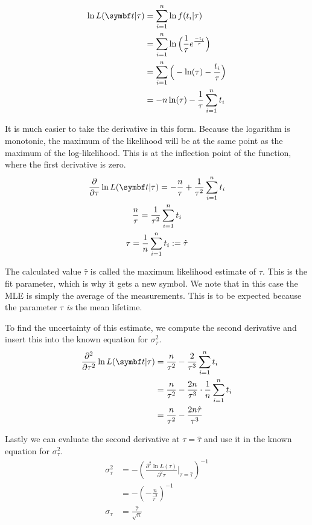 \begin{align}
    \ln L(\vec{t} \given \tau) &= \sum \limits_{i = 1}^{n} \ln f(t_i \given \tau) \\
    &= \sum \limits_{i = 1}^{n} \ln \Big( \frac{1}{\tau} e^{\frac{-t_i}{\tau}} \Big) \\
    &= \sum \limits_{i = 1}^{n} \Big( - \ln (\tau) - \frac{t_i}{\tau} \Big) \\
    &= - n \ln (\tau) - \frac{1}{\tau} \sum \limits_{i = 1}^{n} t_i
\end{align}

It is much easier to take the derivative in this form. Because the logarithm is monotonic, the maximum of the likelihood will be at the same point as the maximum of the log-likelihood. This is at the inflection point of the function, where the first derivative is zero.
\begin{gather}
    \frac{\partial}{\partial \tau} \ln L(\vec{t} \given \tau) = -\frac{n}{\tau} + \frac{1}{\tau^2} \sum \limits_{i = 1}^{n} t_i \\
    \frac{n}{\tau} = \frac{1}{\tau^2} \sum \limits_{i = 1}^{n} t_i \\
    \tau = \frac{1}{n} \sum \limits_{i = 1}^{n} t_i := \hat{\tau}
    \label{eq:mle:tau_hat_mle}
\end{gather}

The calculated value \( \hat{\tau} \) is called the maximum likelihood estimate of \( \tau \). This is the fit parameter, which is why it gets a new symbol. We note that in this case the MLE is simply the average of the measurements. This is to be expected because the parameter \( \tau \) \emph{is} the mean lifetime.

To find the uncertainty of this estimate, we compute the second derivative and insert this into the known equation for $\sigma_\tau^2$.
\begin{align}
    \frac{\partial^2}{\partial \tau^2} \ln L(\vec{t} \given \tau) &= \frac{n}{\tau^2} - \frac{2}{\tau^3} \sum \limits_{i = 1}^{n} t_i \\
    &= \frac{n}{\tau^2} - \frac{2 n}{\tau^3} \cdot \frac{1}{n} \sum \limits_{i = 1}^{n} t_i \\
    &= \frac{n}{\tau^2} - \frac{2 n \hat{\tau}}{\tau^3}
\end{align}

Lastly we can evaluate the second derivative at $\tau = \hat{\tau}$ and use it in the known equation for $\sigma_\tau^2$.
\begin{align}
    \sigma_\tau^2 &= - \left(\frac{\partial^2 \ln L(\tau)}{\partial^2 \tau} \Big|_{\tau = \hat{\tau}} \right)^{-1} \\
    &= - \left(- \frac{n}{\hat{\tau}^2} \right)^{-1} \\
    \sigma_\tau &= \frac{\hat{\tau}}{\sqrt{n}}
    \label{eq:mle:uncertainty_of_tau_hat}
\end{align}

